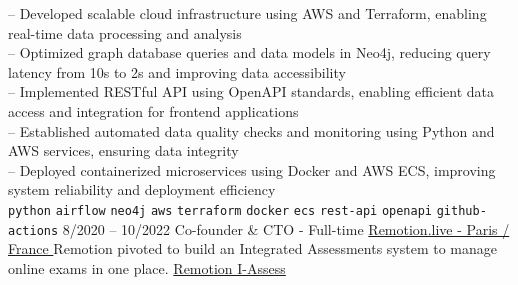 \begin{entrylist}
{        -- Developed scalable cloud infrastructure using AWS and Terraform, enabling real-time data processing and analysis \\
        -- Optimized graph database queries and data models in Neo4j, reducing query latency from 10s to 2s and improving data accessibility \\
        -- Implemented RESTful API using OpenAPI standards, enabling efficient data access and integration for frontend applications \\
        -- Established automated data quality checks and monitoring using Python and AWS services, ensuring data integrity \\
        -- Deployed containerized microservices using Docker and AWS ECS, improving system reliability and deployment efficiency \\
        \texttt{python}\slashsep
        \texttt{airflow}\slashsep
        \texttt{neo4j}\slashsep
        \texttt{aws}\slashsep
        \texttt{terraform}\slashsep
        \texttt{docker}\slashsep
        \texttt{ecs}\slashsep
        \texttt{rest-api}\slashsep
        \texttt{openapi}\slashsep
        \texttt{github-actions}\slashsep
    }
    \entry
    {8/2020 -- 10/2022}
    {Co-founder \& CTO - Full-time}
    {\href{https://remotion.live/}{Remotion.live - Paris / France }}
    {Remotion pivoted to build an Integrated Assessments system to manage online exams in one place.
        \href{https://remotion.live/} {Remotion I-Assess} \\\\

}
\end{entrylist}
